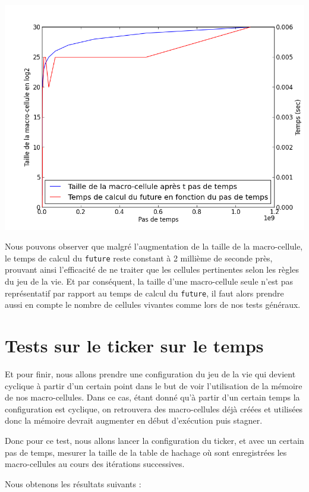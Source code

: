 \documentclass[a4paper,12pt]{report}
\begin{document}
\includegraphics[scale=0.7]{glider_future.png}

Nous pouvons observer que malgré l'augmentation de la taille de la
macro-cellule, le temps de calcul du \texttt{future} reste constant à
2 millième de seconde près, prouvant ainsi l'efficacité de ne traiter
que les cellules pertinentes selon les règles du jeu de la vie. Et par
conséquent, la taille d'une macro-cellule seule n'est pas
représentatif par rapport au temps de calcul du \texttt{future}, il
faut alors prendre aussi en compte le nombre de cellules vivantes
comme lors de nos tests généraux.

\section{Tests sur le ticker sur le temps}

Et pour finir, nous allons prendre une configuration du jeu de la vie
qui devient cyclique à partir d'un certain point dans le but de voir
l'utilisation de la mémoire de nos macro-cellules. Dans ce cas, étant
donné qu'à partir d'un certain temps la configuration est cyclique, on
retrouvera des macro-cellules déjà créées et utilisées donc la mémoire
devrait augmenter en début d'exécution puis stagner.

Donc pour ce test, nous allons lancer la configuration du ticker, et
avec un certain pas de temps, mesurer la taille de la table de
hachage où sont enregistrées les macro-cellules au cours des
itérations successives.

\medskip

Nous obtenons les résultats suivants :
\end{document}
